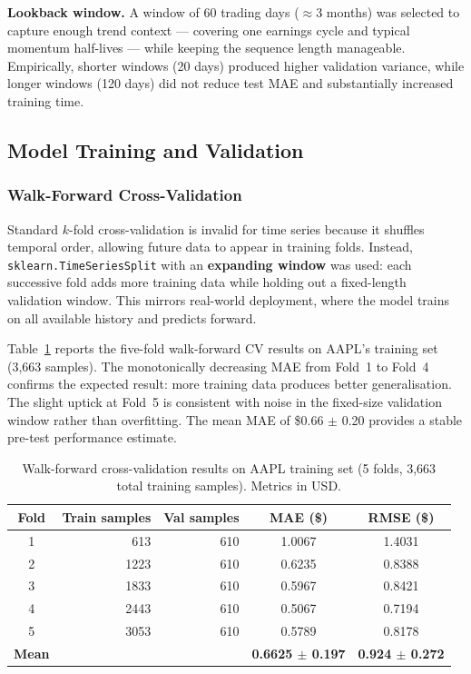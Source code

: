 \documentclass[12pt, a4paper]{article}
\begin{document}
\textbf{Lookback window.} A window of 60 trading days ($\approx$3 months) was
selected to capture enough trend context --- covering one earnings cycle and
typical momentum half-lives --- while keeping the sequence length manageable.
Empirically, shorter windows (20 days) produced higher validation variance,
while longer windows (120 days) did not reduce test MAE and substantially
increased training time.

\subsection{Model Training and Validation}

\subsubsection{Walk-Forward Cross-Validation}

Standard $k$-fold cross-validation is invalid for time series because it
shuffles temporal order, allowing future data to appear in training folds.
Instead, \texttt{sklearn.TimeSeriesSplit} with an \textbf{expanding window}
was used: each successive fold adds more training data while holding out a
fixed-length validation window. This mirrors real-world deployment, where the
model trains on all available history and predicts forward.

Table~\ref{tab:wfcv} reports the five-fold walk-forward CV results on
AAPL's training set (3,663 samples). The monotonically decreasing MAE from
Fold~1 to Fold~4 confirms the expected result: more training data produces
better generalisation. The slight uptick at Fold~5 is consistent with
noise in the fixed-size validation window rather than overfitting.
The mean MAE of \$0.66 $\pm$ 0.20 provides a stable pre-test performance estimate.

\begin{table}[h]
\centering
\caption{Walk-forward cross-validation results on AAPL training set
         (5 folds, 3,663 total training samples). Metrics in USD.}
\label{tab:wfcv}
\renewcommand{\arraystretch}{1.3}
\begin{tabular}{crrcc}
\hline
\textbf{Fold} & \textbf{Train samples} & \textbf{Val samples}
              & \textbf{MAE (\$)} & \textbf{RMSE (\$)} \\
\hline
1 & 613  & 610 & 1.0067 & 1.4031 \\
2 & 1223 & 610 & 0.6235 & 0.8388 \\
3 & 1833 & 610 & 0.5967 & 0.8421 \\
4 & 2443 & 610 & 0.5067 & 0.7194 \\
5 & 3053 & 610 & 0.5789 & 0.8178 \\
\hline
\textbf{Mean} & & & \textbf{0.6625 $\pm$ 0.197} & \textbf{0.924 $\pm$ 0.272} \\
\hline
\end{tabular}
\end{table}
\end{document}
